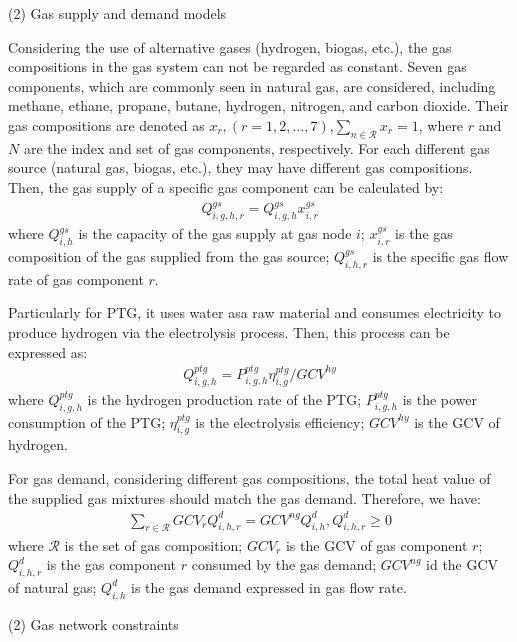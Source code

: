 \documentclass[sn-mathphys,Numbered]{sn-jnl}%
\theoremstyle{thmstyleone}%
\theoremstyle{thmstyletwo}%
\theoremstyle{thmstylethree}%
\begin{document}
(2) Gas supply and demand models

Considering the use of alternative gases (hydrogen, biogas, etc.), the gas compositions in the gas system can not be regarded as constant. Seven gas components, which are commonly seen in natural gas, are considered, including methane, ethane, propane, butane, hydrogen, nitrogen, and carbon dioxide. Their gas compositions are denoted as $x_r, (r = 1,2,...,7)$,$\sum_{n \in \mathcal{R}} x_r = 1$, where $r$ and $N$ are the index and set of gas components, respectively. For each different gas source (natural gas, biogas, etc.), they may have different gas compositions. Then, the gas supply of a specific gas component can be calculated by:
\begin{gather}
    Q_{i,g,h,r}^{gs} = Q_{i,g,h}^{gs} x_{i,r}^{gs}
\end{gather}
where $Q_{i,h}^{gs}$ is the capacity of the gas supply at gas node $i$; $x_{i,r}^{gs}$ is the gas composition of the gas supplied from the gas source; $Q_{i,h,r}^{gs}$ is the specific gas flow rate of gas component $r$.

Particularly for PTG, it uses water asa  raw material and consumes electricity to produce hydrogen via the electrolysis process. Then, this process can be expressed as:
\begin{gather}
    Q_{i,g,h}^{ptg} = P_{i,g,h}^{ptg} \eta_{i,g}^{ptg} / GCV^{hy}
\end{gather}
where $Q_{i,g,h}^{ptg}$ is the hydrogen production rate of the PTG; $P_{i,g,h}^{ptg}$ is the power consumption of the PTG; $\eta_{i,g}^{ptg}$ is the electrolysis efficiency; $GCV^{hy}$ is the GCV of hydrogen.

For gas demand, considering different gas compositions, the total heat value of the supplied gas mixtures should match the gas demand. Therefore, we have:
\begin{gather}
    \sum_{r \in \mathcal{R}} GCV_r Q_{i,h,r}^{d} = GCV^{ng} Q_{i,h}^{d}, Q_{i,h,r}^{d} \geq 0
\end{gather}
where $\mathcal{R}$ is the set of gas composition; $GCV_r$ is the GCV of gas component $r$; $Q_{i,h,r}^{d}$ is the gas component $r$ consumed by the gas demand; $GCV^{ng}$ id the GCV of natural gas; $Q_{i,h}^{d}$ is the gas demand expressed in gas flow rate. 

(2) Gas network constraints
\end{document}
